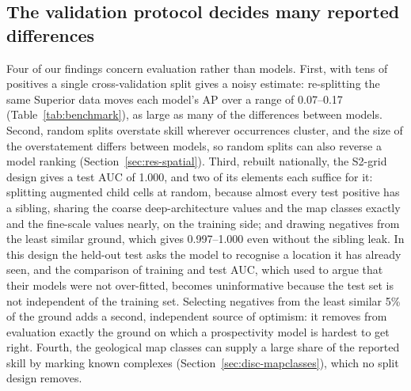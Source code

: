 \documentclass[pdflatex,sn-apa]{sn-jnl}
\begin{document}
\subsection{The validation protocol decides many reported differences}\label{sec:disc-protocol}

Four of our findings concern evaluation rather than models. First, with tens of positives a single cross-validation split gives a noisy estimate: re-splitting the same Superior data moves each model's AP over a range of 0.07--0.17 (Table~\ref{tab:benchmark}), as large as many of the differences between models. Second, random splits overstate skill wherever occurrences cluster, and the size of the overstatement differs between models, so random splits can also reverse a model ranking (Section~\ref{sec:res-spatial}). Third, rebuilt nationally, the S2-grid design gives a test AUC of 1.000, and two of its elements each suffice for it: splitting augmented child cells at random, because almost every test positive has a sibling, sharing the coarse deep-architecture values and the map classes exactly and the fine-scale values nearly, on the training side; and drawing negatives from the least similar ground, which gives 0.997--1.000 even without the sibling leak. In this design the held-out test asks the model to recognise a location it has already seen, and the comparison of training and test AUC, which \citet{Parsa2024} used to argue that their models were not over-fitted, becomes uninformative because the test set is not independent of the training set. Selecting negatives from the least similar 5\% of the ground adds a second, independent source of optimism: it removes from evaluation exactly the ground on which a prospectivity model is hardest to get right. Fourth, the geological map classes can supply a large share of the reported skill by marking known complexes (Section~\ref{sec:disc-mapclasses}), which no split design removes.
\end{document}
